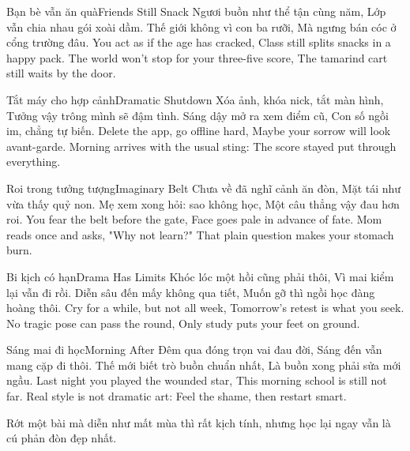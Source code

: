 \begin{tutuyetbox}{Bạn bè vẫn ăn quà}{Friends Still Snack}
Ngươi buồn như thể tận cùng năm,
Lớp vẫn chia nhau gói xoài dầm.
Thế giới không vì con ba rưỡi,
Mà ngưng bán cóc ở cổng trường đâu.
\tcblower
You act as if the age has cracked,
Class still splits snacks in a happy pack.
The world won't stop for your three-five score,
The tamarind cart still waits by the door.
\end{tutuyetbox}

\begin{tutuyetbox}{Tắt máy cho hợp cảnh}{Dramatic Shutdown}
Xóa ảnh, khóa nick, tắt màn hình,
Tưởng vậy trông mình sẽ đậm tình.
Sáng dậy mở ra xem điểm cũ,
Con số ngồi im, chẳng tự biến.
\tcblower
Delete the app, go offline hard,
Maybe your sorrow will look avant-garde.
Morning arrives with the usual sting:
The score stayed put through everything.
\end{tutuyetbox}

\begin{tutuyetbox}{Roi trong tưởng tượng}{Imaginary Belt}
Chưa về đã nghĩ cảnh ăn đòn,
Mặt tái như vừa thấy quỷ non.
Mẹ xem xong hỏi: sao không học,
Một câu thẳng vậy đau hơn roi.
\tcblower
You fear the belt before the gate,
Face goes pale in advance of fate.
Mom reads once and asks, "Why not learn?"
That plain question makes your stomach burn.
\end{tutuyetbox}

\begin{tutuyetbox}{Bi kịch có hạn}{Drama Has Limits}
Khóc lóc một hồi cũng phải thôi,
Vì mai kiểm lại vẫn đi rồi.
Diễn sâu đến mấy không qua tiết,
Muốn gỡ thì ngồi học đàng hoàng thôi.
\tcblower
Cry for a while, but not all week,
Tomorrow's retest is what you seek.
No tragic pose can pass the round,
Only study puts your feet on ground.
\end{tutuyetbox}

\begin{tutuyetbox}{Sáng mai đi học}{Morning After}
Đêm qua đóng trọn vai đau đời,
Sáng đến vẫn mang cặp đi thôi.
Thế mới biết trò buồn chuẩn nhất,
Là buồn xong phải sửa mới ngầu.
\tcblower
Last night you played the wounded star,
This morning school is still not far.
Real style is not dramatic art:
Feel the shame, then restart smart.
\end{tutuyetbox}

\begin{ghichu}
Rớt một bài mà diễn như mất mùa thì rất kịch tính, nhưng học lại ngay vẫn là cú phản đòn đẹp nhất.
\end{ghichu}
